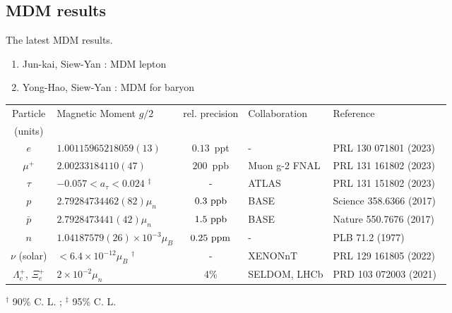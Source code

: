 \documentclass[12pt]{article}
\begin{document}
\newpage 
\begin{landscape}
\section{MDM results}

\noindent The latest MDM results.
\begin{enumerate}
\item Jun-kai, Siew-Yan : MDM lepton
\item Yong-Hao, Siew-Yan  : MDM for baryon
\end{enumerate}

\begin{table}[ht]
\begin{center}
\begin{tabular}{|c|l|c|l|l|}
\hline \hline
Particle & Magnetic Moment $g/2$ & rel. precision  & Collaboration  & Reference \\ 
(units)  & &  &  &  \\ 
\hline
$e$ & $1.00115965218059(13)$ & $0.13$~ppt  & - & PRL 130 071801 (2023)~\cite{PhysRevLett.130.071801}  \\ \hline
$\mu^{+}$ & $2.00233184110(47)$ & $200$~ppb & Muon g-2 FNAL  & PRL 131 161802 (2023)~\cite{PhysRevLett.131.161802}   \\ \hline
$\tau$ & $-0.057<a_{\tau}<0.024$ ${}^{\ddagger}$ & - & ATLAS & PRL 131 151802 (2023)~\cite{PhysRevLett.131.151802}  \\ \hline
$p$ & $2.79284734462(82)\mu_n$ & $\rm 0.3~ppb$ & BASE  & Science 358.6366 (2017)~\cite{pMDM} \\ \hline
$\bar{p}$ & $2.7928473441(42)\mu_n$ & $\rm 1.5~ppb$ & BASE & Nature 550.7676 (2017)~\cite{pbarMDM} \\ \hline
$n$ & $1.04187579(26) \times 10^{-3} \mu_{B}$ & $\rm 0.25~ppm$ & - & PLB 71.2 (1977)~\cite{GREENE1977297}  \\ \hline
$\nu$ (solar) & $<6.4 \times 10^{-12} \mu_{B}$ ${}^{\dagger}$ & - & XENONnT &  PRL 129 161805 (2022)~\cite{PhysRevLett.129.161805} \\ \hline
$\Lambda^+_c$, $\Xi^+_c$ & $2\times10^{-2}\mu_n$ & 4\% &SELDOM, LHCb & PRD 103 072003 (2021)~\cite{charmBaryons}\\ \hline
\hline
\hline
\end{tabular}
\end{center}
${}^{\dagger}$ 90\% C. L. ; ${}^{\ddagger}$ 95\% C. L.
\end{table}
\end{landscape}

%
\printbibliography
\end{document}
